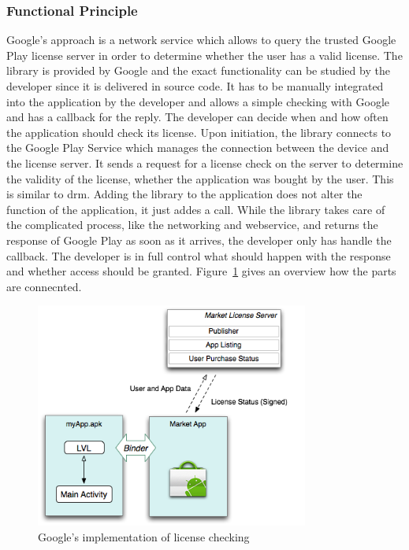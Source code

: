 \subsubsection{Functional Principle} \label{section:license-google-functional}
Google's approach is a network service which allows to query the trusted Google Play license server in order to determine whether the user has a valid license.
The library is provided by Google and the exact functionality can be studied by the developer since it is delivered in source code.\cite{munteanLicense}
\newline
It has to be manually integrated into the application by the developer and allows a simple checking with Google and has a callback for the reply.
The developer can decide when and how often the application should check its license.
Upon initiation, the library connects to the Google Play Service which manages the connection between the device and the license server.
It sends a request for a license check on the server to determine the validity of the license, whether the application was bought by the user.
This is similar to \gls{drm}.
Adding the library to the application does not alter the function of the application, it just addes a call.
While the library takes care of the complicated process, like the networking and webservice, and returns the response of Google Play as soon as it arrives, the developer only has handle the callback.
The developer is in full control what should happen with the response and whether access should be granted.
Figure~\ref{fig:lvl} gives an overview how the parts are connecnted. \cite{digipomLvl} \cite{developersLicensingOverview}
\newline
\begin{figure}[h]
    \centering
    \includegraphics[width=0.8\textwidth]{data/lvl.png}
    \caption{Google's implementation of license checking \cite{developersLicensingOverview}}
    \label{fig:lvl}
\end{figure}
